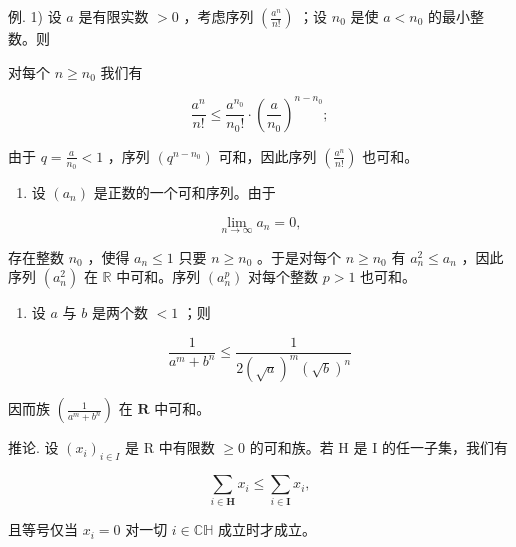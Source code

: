 例. 1) 设 \(a\) 是有限实数 \(>0\) ，考虑序列 \(\left(\frac{a^n}{n!}\right)\) ；设 \(n_0\) 是使 \(a < n_0\) 的最小整数。则

对每个 \(n \geqslant n_0\) 我们有

\[
\frac {a ^ {n}}{n !} \leqslant \frac {a ^ {n _ {0}}}{n _ {0} !} \cdot \left(\frac {a}{n _ {0}}\right) ^ {n - n _ {0}};
\]

由于 \(q = \frac{a}{n_0} < 1\) ，序列 \((q^{n - n_0})\) 可和，因此序列 \(\left(\frac{a^n}{n!}\right)\) 也可和。

\begin{enumerate}
\def\labelenumi{\arabic{enumi})}
\setcounter{enumi}{1}
\tightlist
\item
  设 \((a_{n})\) 是正数的一个可和序列。由于
\end{enumerate}

\[
\lim _ {n \rightarrow \infty} a _ {n} = 0,
\]

存在整数 \(n_0\) ，使得 \(a_n \leqslant 1\) 只要 \(n \geqslant n_0\) 。于是对每个 \(n \geqslant n_0\) 有 \(a_n^2 \leqslant a_n\) ，因此序列 \((a_n^2)\) 在 \(\mathbb{R}\) 中可和。序列 \((a_n^p)\) 对每个整数 \(p > 1\) 也可和。

\begin{enumerate}
\def\labelenumi{\arabic{enumi})}
\setcounter{enumi}{2}
\tightlist
\item
  设 \(a\) 与 \(b\) 是两个数 \(< 1\) ；则
\end{enumerate}

\[
\frac {1}{a ^ {m} + b ^ {n}} \leqslant \frac {1}{2 (\sqrt {a}) ^ {m} (\sqrt {b}) ^ {n}}
\]

因而族 \(\left(\frac{1}{a^m + b^n}\right)\) 在 \(\mathbf{R}\) 中可和。

推论. 设 \((x_{i})_{i\in I}\) 是 R 中有限数 \(\geqslant 0\) 的可和族。若 H 是 I 的任一子集，我们有

\[
\sum_ {i \in \mathbf {H}} x _ {i} \leqslant \sum_ {i \in \mathbf {I}} x _ {i},
\]

且等号仅当 \(x_{i} = 0\) 对一切 \(i \in \mathbb{C}\mathbb{H}\) 成立时才成立。

